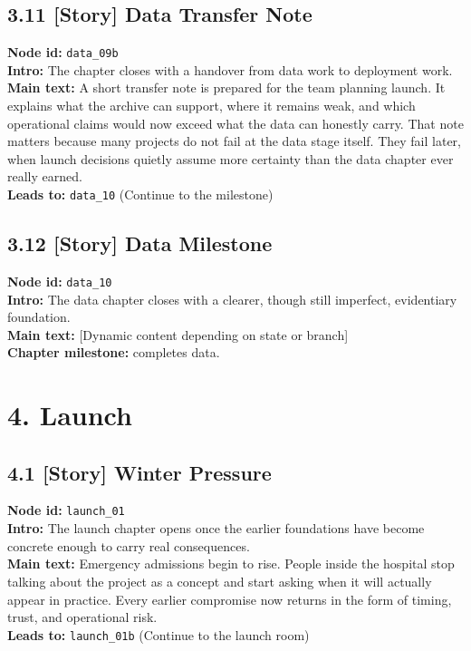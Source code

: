\documentclass[11pt]{article}
\begin{document}
\subsection*{3.11 [Story] Data Transfer Note}
\textbf{Node id:} \texttt{data\_09b}\\
\textbf{Intro:} The chapter closes with a handover from data work to deployment work.\\
\textbf{Main text:} A short transfer note is prepared for the team planning launch. It explains what the archive can support, where it remains weak, and which operational claims would now exceed what the data can honestly carry. That note matters because many projects do not fail at the data stage itself. They fail later, when launch decisions quietly assume more certainty than the data chapter ever really earned.\\
\textbf{Leads to:} \texttt{data\_10} (Continue to the milestone)\\
\subsection*{3.12 [Story] Data Milestone}
\textbf{Node id:} \texttt{data\_10}\\
\textbf{Intro:} The data chapter closes with a clearer, though still imperfect, evidentiary foundation.\\
\textbf{Main text:} [Dynamic content depending on state or branch]\\
\textbf{Chapter milestone:} completes data.\\
\section*{4. Launch}
\subsection*{4.1 [Story] Winter Pressure}
\textbf{Node id:} \texttt{launch\_01}\\
\textbf{Intro:} The launch chapter opens once the earlier foundations have become concrete enough to carry real consequences.\\
\textbf{Main text:} Emergency admissions begin to rise. People inside the hospital stop talking about the project as a concept and start asking when it will actually appear in practice. Every earlier compromise now returns in the form of timing, trust, and operational risk.\\
\textbf{Leads to:} \texttt{launch\_01b} (Continue to the launch room)\\
\end{document}

